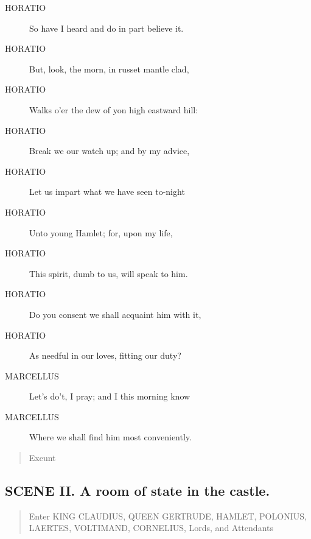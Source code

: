 \documentclass{article}
\begin{document}
\begin{description}
            
\item[HORATIO] So have I heard and do in part believe it.
\item[HORATIO] But, look, the morn, in russet mantle clad,
\item[HORATIO] Walks o'er the dew of yon high eastward hill:
\item[HORATIO] Break we our watch up; and by my advice,
\item[HORATIO] Let us impart what we have seen to-night
\item[HORATIO] Unto young Hamlet; for, upon my life,
\item[HORATIO] This spirit, dumb to us, will speak to him.
\item[HORATIO] Do you consent we shall acquaint him with it,
\item[HORATIO] As needful in our loves, fitting our duty?
\end{description}
          
\begin{description}
            
\item[MARCELLUS] Let's do't, I pray; and I this morning know
\item[MARCELLUS] Where we shall find him most conveniently.
\end{description}
          
\begin{quote}
Exeunt
\end{quote}
          
\subsection{SCENE II.  A room of state in the castle.}
          
\begin{quote}
Enter KING CLAUDIUS, QUEEN GERTRUDE, HAMLET,
POLONIUS, LAERTES, VOLTIMAND, CORNELIUS, Lords,
and Attendants
\end{quote}
          
\end{document}
